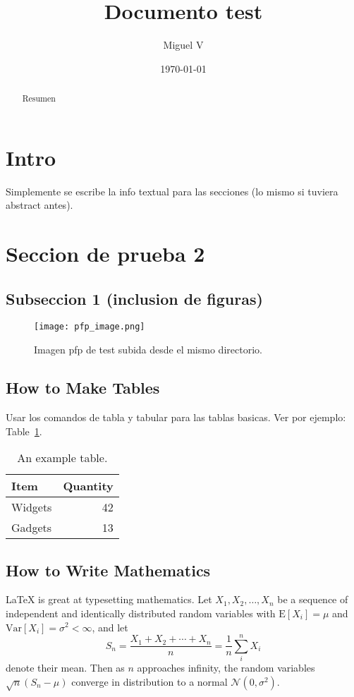 \documentclass[a4paper]{article}
\title{Documento test}
\author{Miguel V}
\date{\today}
\begin{document}
\maketitle

\begin{abstract}
    Resumen
\end{abstract}

\section{Intro}

Simplemente se escribe la info textual para las secciones (lo mismo si tuviera abstract antes).

\section{Seccion de prueba 2}
\subsection{Subseccion 1 (inclusion de figuras)}

\begin{figure}
    \centering
    \texttt{[image: pfp\_image.png]}
    \caption{\label{fig:pfp_image}Imagen pfp de test subida desde el mismo directorio.}
\end{figure}


\subsection{How to Make Tables}

Usar los comandos de tabla y tabular para las tablas basicas. Ver por ejemplo: Table~\ref{tab:widgets}.

\begin{table}
    \centering
    \begin{tabular}{l|r}
        Item & Quantity \\\hline
        Widgets & 42 \\
        Gadgets & 13
    \end{tabular}
    \caption{\label{tab:widgets}An example table.}
\end{table}

\subsection{How to Write Mathematics}

\LaTeX{} is great at typesetting mathematics. Let $X_1, X_2, \ldots, X_n$ be a sequence of independent and identically distributed random variables with $\text{E}[X_i] = \mu$ and $\text{Var}[X_i] = \sigma^2 < \infty$, and let
$$S_n = \frac{X_1 + X_2 + \cdots + X_n}{n}
      = \frac{1}{n}\sum_{i}^{n} X_i$$
denote their mean. Then as $n$ approaches infinity, the random variables $\sqrt{n}(S_n - \mu)$ converge in distribution to a normal $\mathcal{N}(0, \sigma^2)$.
\end{document}

